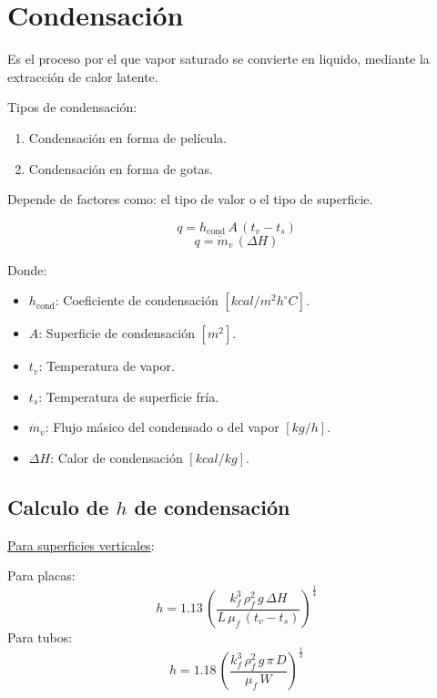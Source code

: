 \section{Condensación}
Es el proceso por el que vapor saturado se convierte en liquido, mediante la
extracción de calor latente.


Tipos de condensación:
\begin{enumerate}
    \item Condensación en forma de película.
    \item Condensación en forma de gotas.
\end{enumerate}

Depende de factores como: el tipo de valor o el tipo de superficie.

\begin{equation*}
    q = h_{\text{cond}}\,A\,(t_v - t_s)
\end{equation*}
\begin{equation*}
    q = \dot{m}_v\,(\Delta H)
\end{equation*}

Donde:
\begin{itemize}
    \item $h_{\text{cond}}$: Coeficiente de condensación $[kcal/m^2 h ^\circ C]$.
    \item $A$: Superficie de condensación $[m^2]$.
    \item $t_v$: Temperatura de vapor.
    \item $t_s$: Temperatura de superficie fría.
    \item $\dot{m}_v$: Flujo másico del condensado o del vapor $[kg/h]$.
    \item $\Delta H$: Calor de condensación $[kcal/kg]$.
\end{itemize}

\subsection{Calculo de $h$ de condensación}

\underline{Para superficies verticales}:

Para placas:
\begin{equation}
    h = 1.13\,\left(\frac{k_f^3\,\rho_f^2\,g\,\Delta H}{L\,\mu_f\,(t_v - t_s)}\right)^{\frac{1}{4}}
\end{equation}
Para tubos:
\begin{equation}
    h = 1.18\,\left(\frac{k_f^3\,\rho_f^2\,g\,\pi\,D}{\mu_f\,W}\right)^{\frac{1}{3}}
\end{equation}

